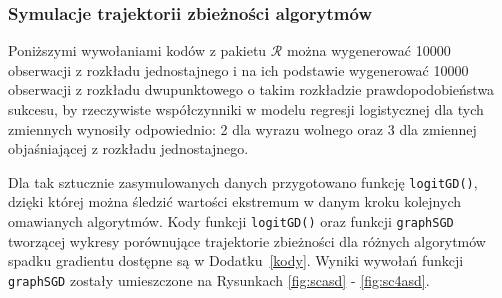 \newpage
\subsubsection{Symulacje trajektorii zbieżności algorytmów}
Poniższymi wywołaniami kodów z pakietu $\mathcal{R}$ \cite{programikr} można wygenerować 10000 obserwacji z rozkładu jednostajnego i na ich podstawie wygenerować 10000 obserwacji z rozkładu dwupunktowego o takim rozkładzie prawdopodobieństwa sukcesu, by rzeczywiste współczynniki w modelu regresji logistycznej dla tych zmiennych wynosiły odpowiednio: 2 dla wyrazu wolnego oraz 3 dla zmiennej objaśniającej z rozkładu jednostajnego. 
\begin{Shaded}
\begin{Highlighting}[]
\StringTok{ }\NormalTok{(}\NormalTok{)}
\StringTok{ } \NormalTok{+}\StringTok{ }
\StringTok{ }\NormalTok{/(}\NormalTok{+}
\StringTok{ }\NormalTok{(}\NormalTok{,}
\end{Highlighting}
\end{Shaded}

Dla tak sztucznie zasymulowanych danych przygotowano funkcję \texttt{logitGD()}, dzięki której można śledzić wartości ekstremum w danym kroku kolejnych omawianych algorytmów. Kody funkcji \texttt{logitGD()} oraz funkcji \texttt{graphSGD} tworzącej wykresy porównujące trajektorie zbieżności dla różnych algorytmów spadku gradientu  dostępne są w Dodatku~\ref{kody}. Wyniki wywołań funkcji \texttt{graphSGD} zostały umieszczone na Rysunkach \ref{fig:scasd} - \ref{fig:sc4asd}.

